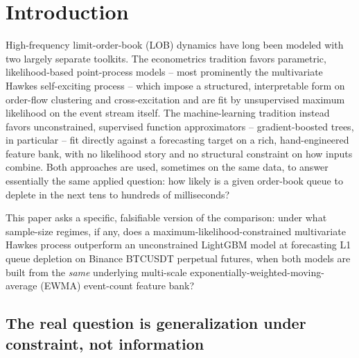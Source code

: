 \section{Introduction}
\label{sec:introduction}

High-frequency limit-order-book (LOB) dynamics have long been modeled with
two largely separate toolkits. The econometrics tradition favors
parametric, likelihood-based point-process models -- most prominently the
multivariate Hawkes self-exciting process -- which impose a structured,
interpretable form on order-flow clustering and cross-excitation and are
fit by unsupervised maximum likelihood on the event stream itself. The
machine-learning tradition instead favors unconstrained, supervised
function approximators -- gradient-boosted trees, in particular -- fit
directly against a forecasting target on a rich, hand-engineered feature
bank, with no likelihood story and no structural constraint on how inputs
combine. Both approaches are used, sometimes on the same data, to answer
essentially the same applied question: how likely is a given order-book
queue to deplete in the next tens to hundreds of milliseconds?

This paper asks a specific, falsifiable version of the comparison: under
what sample-size regimes, if any, does a maximum-likelihood-constrained
multivariate Hawkes process outperform an unconstrained LightGBM model at
forecasting L1 queue depletion on Binance BTCUSDT perpetual futures, when
both models are built from the \emph{same} underlying multi-scale
exponentially-weighted-moving-average (EWMA) event-count feature bank?

\subsection{The real question is generalization under constraint, not information}
\label{sec:intro-structural-note}

